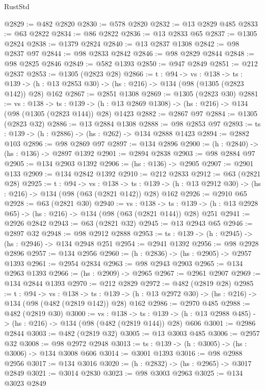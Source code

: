 \begin{lexlean}{RustStd}
\begin{coremodule}
@2829 := @482 @2820
@2830 := @578 @2820
@2832 := @13 @2829 @485
@2833 := @63 @2822
@2834 := @86 @2822
@2836 := @13 @2833 @65
@2837 := @1305 @2824
@2838 := @1379 @2824
@2840 := @13 @2837 @1308
@2842 := @98 @2837 @97
@2844 := @98 @2833 @2842
@2846 := @98 @2829 @2844
@2848 := @98 @2825 @2846
@2849 := @582 @1393
@2850 := @947 @2849
@2851 := @212 @2837
@2853 := @1305 (@2823 @28)
@2866 := {t : @94} ->
  {vs : @138} ->
  {ts : @139} -> (h : @13 @2853 @30) -> (hs : @216) -> @134 (@98 (@1305 (@2823 @142)) @28) @162
@2867 := @2851 @1308
@2869 := @1305 (@2823 @30)
@2881 := {vs : @138} ->
  {ts : @139} -> (h : @13 @2869 @1308) -> (hs : @216) -> @134 (@98 (@1305 (@2823 @144)) @28) @1423
@2882 := @2867 @97
@2884 := @1305 (@2823 @32)
@2886 := @13 @2884 @1308
@2888 := @98 @2853 @97
@2893 := {ts : @139} -> (h : @2886) -> (hs : @262) -> @134 @2888 @1423
@2894 := @2882 @103
@2896 := @98 @2869 @97
@2897 := @134 @2896
@2900 := (h : @2840) -> (hs : @136) -> @2897 @1392
@2901 := @2894 @2838
@2903 := @98 @2884 @97
@2905 := @134 @2903 @1392
@2906 := (hs : @136) -> @2905
@2907 := @2901 @133
@2909 := @134 @2842 @1392
@2910 := @212 @2833
@2912 := @63 (@2821 @28)
@2925 := {t : @94} ->
  {vs : @138} ->
  {ts : @139} -> (h : @13 @2912 @30) -> (hs : @216) -> @134 (@98 (@63 (@2821 @142)) @28) @162
@2926 := @2910 @65
@2928 := @63 (@2821 @30)
@2940 := {vs : @138} ->
  {ts : @139} -> (h : @13 @2928 @65) -> (hs : @216) -> @134 (@98 (@63 (@2821 @144)) @28) @251
@2941 := @2926 @2842
@2943 := @63 (@2821 @32)
@2945 := @13 @2943 @65
@2946 := @2897 @32
@2948 := @98 @2912 @2888
@2953 := {ts : @139} -> (h : @2945) -> (hs : @2946) -> @134 @2948 @251
@2954 := @2941 @1392
@2956 := @98 @2928 @2896
@2957 := @134 @2956
@2960 := (h : @2836) -> (hs : @2905) -> @2957 @1393
@2961 := @2954 @2834
@2963 := @98 @2943 @2903
@2965 := @134 @2963 @1393
@2966 := (hs : @2909) -> @2965
@2967 := @2961 @2907
@2969 := @134 @2844 @1393
@2970 := @212 @2829
@2972 := @482 (@2819 @28)
@2985 := {t : @94} ->
  {vs : @138} ->
  {ts : @139} -> (h : @13 @2972 @30) -> (hs : @216) -> @134 (@98 (@482 (@2819 @142)) @28) @162
@2986 := @2970 @485
@2988 := @482 (@2819 @30)
@3000 := {vs : @138} ->
  {ts : @139} -> (h : @13 @2988 @485) -> (hs : @216) -> @134 (@98 (@482 (@2819 @144)) @28) @606
@3001 := @2986 @2844
@3003 := @482 (@2819 @32)
@3005 := @13 @3003 @485
@3006 := @2957 @32
@3008 := @98 @2972 @2948
@3013 := {ts : @139} -> (h : @3005) -> (hs : @3006) -> @134 @3008 @606
@3014 := @3001 @1393
@3016 := @98 @2988 @2956
@3017 := @134 @3016
@3020 := (h : @2832) -> (hs : @2965) -> @3017 @2849
@3021 := @3014 @2830
@3023 := @98 @3003 @2963
@3025 := @134 @3023 @2849

\end{coremodule}
\end{lexlean}
